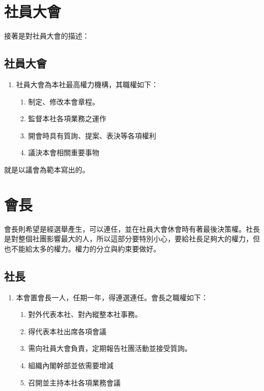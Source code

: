 \documentclass[12pt, a4paper]{NGPLB}
\begin{document}
\section{社員大會}

接著是對社員大會的描述：


\begin{mylisting}
\subsection{社員大會}
\begin{enumerate}
\item 社員大會為本社最高權力機構，其職權如下：
\begin{enumerate}
\item 制定、修改本會章程。 
\item 監督本社各項業務之運作
\item 開會時具有質詢、提案、表決等各項權利
\item 議決本會相關重要事物
\end{enumerate}
\end{enumerate}
\end{mylisting}


就是以議會為範本寫出的。

\section{會長}

會長則希望是經選舉產生，可以連任，並在社員大會休會時有著最後決策權。社長是對整個社團影響最大的人，所以這部分要特別小心，要給社長足夠大的權力，但也不能給太多的權力。權力的分立與約束要做好。


\begin{mylisting}
\subsection{社長}
\begin{enumerate}
\item 本會置會長一人，任期一年，得連選連任。會長之職權如下：
\begin{enumerate}
\item 對外代表本社、對內縱整本社事務。
\item 得代表本社出席各項會議
\item 需向社員大會負責，定期報告社團活動並接受質詢。
\item 組織內閣幹部並依需要增減
\item 召開並主持本社各項業務會議
\end{enumerate}
\end{enumerate}
\end{mylisting}
\end{document}
